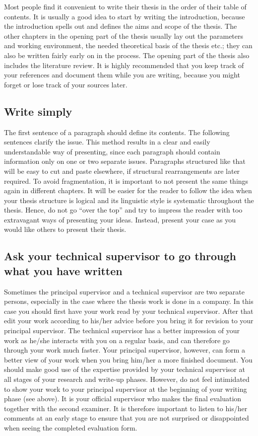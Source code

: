 Most people find it convenient to write their thesis in the order of their table of contents. It is usually a good idea to start by writing the introduction, because the introduction spells out and defines the aims and scope of the thesis. The other chapters in the opening part of the thesis usually lay out the parameters and working environment, the needed theoretical basis of the thesis etc.; they can also be written fairly early on in the process. The opening part of the thesis also includes the literature review. It is highly recommended that you keep track of your references and document them while you are writing, because you might forget or lose track of your sources later.

\subsection{Write simply}

The first sentence of a paragraph should define its contents. The following sentences clarify the issue. This method results in a clear and easily understandable way of presenting, since each paragraph should contain information only on one or two separate issues. Paragraphs structured like that will be easy to cut and paste elsewhere, if structural rearrangements are later required. To avoid fragmentation, it is important to not present the same things again in different chapters. It will be easier for the reader to follow the idea when your thesis structure is logical and its linguistic style is systematic throughout the thesis. Hence, do not go “over the top” and try to impress the reader with too extravagant ways of presenting your ideas. Instead, present your case as you would like others to present their thesis.

\subsection{Ask your technical supervisor to go through what you have written}

Sometimes the principal supervisor and a technical supervisor are two separate persons, especially in the case where the thesis work is done in a company. In this case you should first have your work read by your technical supervisor. After that edit your work according to his/her advice before you bring it for revision to your principal supervisor. The technical supervisor has a better impression of your work as he/she interacts with you on a regular basis, and can therefore go through your work much faster. Your principal supervisor, however, can form a better view of your work when you bring him/her a more finished document. You should make good use of the expertise provided by your technical supervisor at all stages of your research and write-up phases. However, do not feel intimidated to show your work to your principal supervisor at the beginning of your writing phase (see  above). It is your official supervisor who makes the final evaluation together with the second examiner. It is therefore important to listen to his/her comments at an early stage to ensure that you are not surprised or disappointed when seeing the completed evaluation form.

